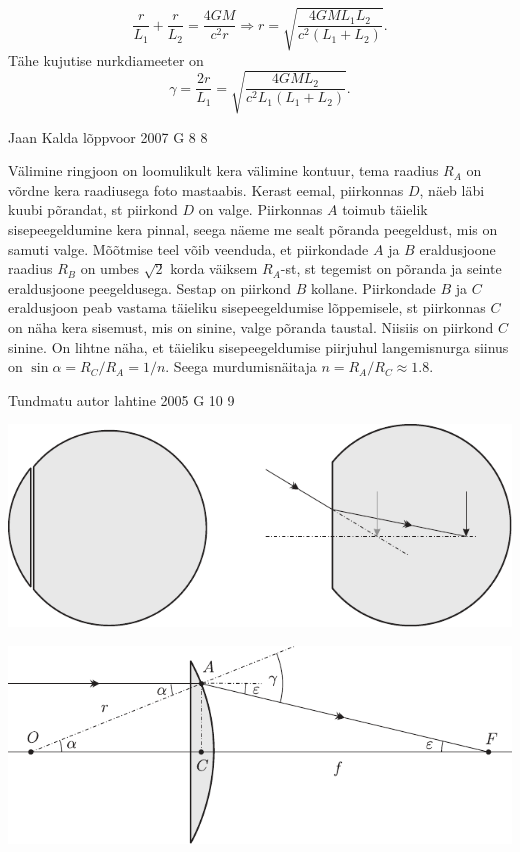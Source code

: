 \documentclass[11pt, twoside]{article}
\begin{document}
{{\[
\frac{r}{L_{1}}+\frac{r}{L_{2}}=\frac{4 G M}{c^{2} r} \Rightarrow r=\sqrt{\frac{4 G M L_{1} L_{2}}{c^{2}\left(L_{1}+L_{2}\right)}}.
\]
Tähe kujutise nurkdiameeter on
\[
\gamma=\frac{2 r}{L_{1}}=\sqrt{\frac{4 G M L_{2}}{c^{2} L_{1}\left(L_{1}+L_{2}\right)}}.
\]
\fi
}

{Jaan Kalda} %
{lõppvoor} %
{2007} %
{G 8} %
{8} %
{

\ifSolution
Välimine ringjoon on loomulikult kera välimine kontuur, tema raadius $R_A$ on võrdne kera raadiusega foto mastaabis. Kerast eemal, piirkonnas $D$, näeb läbi kuubi põrandat, st piirkond $D$ on valge. Piirkonnas $A$ toimub täielik sisepeegeldumine kera pinnal, seega näeme me sealt põranda peegeldust, mis on samuti valge. Mõõtmise teel võib veenduda, et piirkondade $A$ ja $B$ eraldusjoone raadius $R_B$ on umbes $\sqrt 2$ korda väiksem $R_A$-st, st tegemist on põranda ja seinte eraldusjoone peegeldusega. Sestap on piirkond $B$ kollane. Piirkondade $B$ ja $C$ eraldusjoon peab vastama täieliku sisepeegeldumise lõppemisele, st piirkonnas $C$ on näha kera sisemust, mis on sinine, valge põranda taustal. Niisiis on piirkond $C$ sinine. On lihtne näha, et täieliku sisepeegeldumise piirjuhul langemisnurga siinus on $\sin \alpha = R_C/R_A = 1/n$. Seega murdumisnäitaja $n = R_A/R_C \approx \num{1,8}$.
\fi
}

{Tundmatu autor} %
{lahtine} %
{2005} %
{G 10} %
{9} %
{

\ifSolution
\begin{center}
	\includegraphics[width=\linewidth]{2005-lahg-10-lah1}
\end{center}

\begin{center}
	\includegraphics[width=\linewidth]{2005-lahg-10-lah2}
\end{center}

}}
\end{document}
